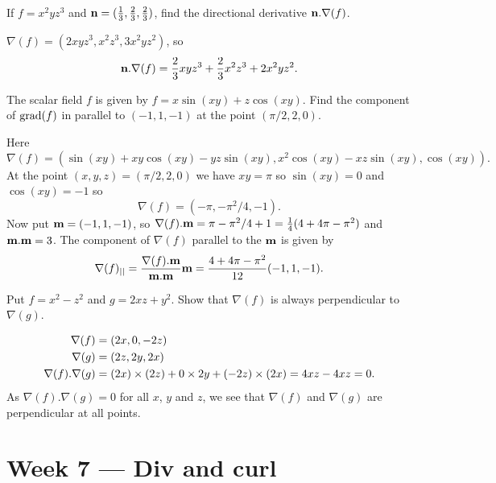 \documentclass[a4paper]{amsart}
\renewenvironment{solution}{\SolutionInline}{\endSolutionInline}
\begin{document}
\begin{exercise}
 If $f=x^2yz^3$ and $\mathbf{n}=(\frac{1}{3},\frac{2}{3},\frac{2}{3})$, find
 the directional derivative $\mathbf{n}.\nabla(f)$.
\end{exercise}
\begin{solution}
 $\nabla(f)=(2xyz^3,x^2z^3,3x^2yz^2)$, so 
 \[ \mathbf{n}.\nabla(f) =
     \frac{2}{3}xyz^3 + \frac{2}{3}x^2z^3 + 2x^2yz^2.
 \]
\end{solution}

\begin{exercise}
 The scalar field $f$ is given by $f=x\sin(xy)+z\cos(xy)$.
 Find the component of $\operatorname{grad}(f)$ in parallel to $(-1,1,-1)$ at the point
 $(\pi/2,2,0)$.
\end{exercise}
\begin{solution}
 Here 
 \[ \nabla(f)=(\sin(xy)+xy\cos(xy)-yz\sin(xy),
               x^2\cos(xy)-xz\sin(xy),\cos(xy)).
 \]
 At the point $(x,y,z)=(\pi/2,2,0)$ we have $xy=\pi$ so $\sin(xy)=0$ and
 $\cos(xy)=-1$ so 
 \[ \nabla(f) = (-\pi,-\pi^2/4,-1). \]
 Now put $\mathbf{m}=(-1,1,-1)$, so
 $\nabla(f).\mathbf{m}=\pi-\pi^2/4+1=\frac{1}{4}(4+4\pi-\pi^2)$ and
 $\mathbf{m}.\mathbf{m}=3$.  The component of $\nabla(f)$ parallel to the $\mathbf{m}$ is
 given by  
 \[ \nabla(f)_{||} = \frac{\nabla(f).\mathbf{m}}{\mathbf{m}.\mathbf{m}} \mathbf{m} =
     \frac{4+4\pi-\pi^2}{12} (-1,1,-1).
 \]
\end{solution}

\begin{exercise}
 Put $f=x^2-z^2$ and $g=2xz+y^2$.  Show that $\nabla(f)$ is always
 perpendicular to $\nabla(g)$.
\end{exercise}
\begin{solution}
 \begin{align*}
  \nabla(f) &= (2x,0,-2z) \\
  \nabla(g) &= (2z,2y,2x) \\
  \nabla(f) . \nabla(g) &= 
    (2x)\times(2z) + 0\times 2y + (-2z)\times(2x) = 4xz-4xz = 0.
 \end{align*}
 As $\nabla(f).\nabla(g)=0$ for all $x$, $y$ and $z$, we see that
 $\nabla(f)$ and $\nabla(g)$ are perpendicular at all points.
\end{solution}

\section*{Week 7 --- Div and curl }
\end{document}
